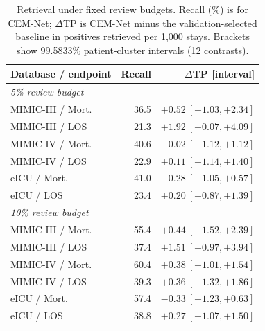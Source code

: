 \begin{table}[tp]
\centering\footnotesize
\setlength{\tabcolsep}{3pt}
\caption{Retrieval under fixed review budgets. Recall (\%) is for CEM-Net; $\Delta$TP is CEM-Net minus the validation-selected baseline in positives retrieved per 1,000 stays. Brackets show 99.5833\% patient-cluster intervals (12 contrasts).}
\label{tab:review-budget}
\begin{tabular}{lrr}
\toprule
Database / endpoint & Recall & $\Delta$TP [interval] \\
\midrule
\multicolumn{3}{l}{\textit{5\% review budget}} \\
MIMIC-III / Mort. & 36.5 & $+0.52\ [-1.03,+2.34]$ \\
MIMIC-III / LOS & 21.3 & $+1.92\ [+0.07,+4.09]$ \\
MIMIC-IV / Mort. & 40.6 & $-0.02\ [-1.12,+1.12]$ \\
MIMIC-IV / LOS & 22.9 & $+0.11\ [-1.14,+1.40]$ \\
eICU / Mort. & 41.0 & $-0.28\ [-1.05,+0.57]$ \\
eICU / LOS & 23.4 & $+0.20\ [-0.87,+1.39]$ \\
\midrule
\multicolumn{3}{l}{\textit{10\% review budget}} \\
MIMIC-III / Mort. & 55.4 & $+0.44\ [-1.52,+2.39]$ \\
MIMIC-III / LOS & 37.4 & $+1.51\ [-0.97,+3.94]$ \\
MIMIC-IV / Mort. & 60.4 & $+0.38\ [-1.01,+1.54]$ \\
MIMIC-IV / LOS & 39.3 & $+0.36\ [-1.32,+1.86]$ \\
eICU / Mort. & 57.4 & $-0.33\ [-1.23,+0.63]$ \\
eICU / LOS & 38.8 & $+0.27\ [-1.07,+1.50]$ \\
\bottomrule
\end{tabular}
\end{table}
